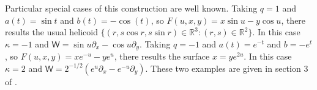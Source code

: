 \documentclass [leqno, 10pt]{amsart}
\theoremstyle{definition}
\numberwithin{equation}{section}
\newcommand{\ka}{\kappa}
\newcommand{\nm}{\mathsf{W}}
\newcommand{\pr}{\partial}
\newcommand{\rea}{\mathbb R}
\begin{document}
Particular special cases of this construction are well known. Taking $q = 1$ and $a(t) = \sin t$ and $b(t) = -\cos(t)$, so $F(u, x, y) = x\sin u - y \cos u$, there results the usual helicoid $\{(r, s\cos r, s\sin r)\in \rea^{3}: (r, s) \in \rea^{2}\}$. In this case $\ka = -1$ and $\nm = \sin u \pr_{x} - \cos u \pr_{y}$. Taking $q = -1$ and $a(t) = e^{-t}$ and $b = -e^{t}$, so $F(u, x, y) = xe^{-u} - ye^{u}$, there results the surface $x = ye^{2u}$. In this case $\ka = 2$ and $\nm = 2^{-1/2}(e^{u}\pr_{x} - e^{-u}\pr_{y})$. These two examples are given in section $3$ of \cite{Verstraelen-Vrancken}.

\end{document}
